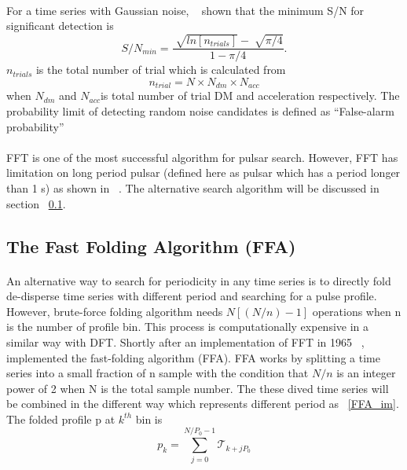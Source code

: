 \documentclass[thesis_msc.tex]{subfiles}
\begin{document}
        \paragraph{} For a time series with Gaussian noise, ~\cite{handbook} shown that the minimum S/N for significant detection is
        \begin{equation}
        S/N_{min}=\frac{\sqrt[]{ln[n_{trials}]}-\sqrt[]{\pi/4}}{1-\pi/4}.
        \end{equation}
		$n_{trials}$ is the total number of trial which is calculated from 
        \begin{equation} \label{n_trial}
        n_{trial}=N \times N_{dm} \times N_{acc}
        \end{equation}
        when $N_{dm}$  and $N_{acc}$is total number of trial DM and acceleration respectively. The probability limit of detecting random noise candidates is defined as ``False-alarm probability''  
\paragraph{} FFT is one of the most successful algorithm for pulsar search. However, FFT has limitation on long period pulsar (defined here as pulsar which has a period longer than 1 s) as shown in  ~\citep{kondratiev2009new}. The alternative search algorithm will be discussed in section ~\ref{FFA}.

        \subsection{The Fast Folding Algorithm (FFA)} \label{FFA}
        \paragraph{} An alternative way to search for periodicity in any time series is to directly fold de-disperse time series with different period and searching for a pulse profile. However, brute-force folding algorithm needs $N[(N/n)-1]$ operations when n is the number of profile bin. This process is computationally expensive in a similar way with DFT. Shortly after an implementation of FFT in 1965 ~\citep{FFT}, ~\cite{staelin1969passive} implemented the fast-folding algorithm (FFA). FFA works by splitting a time series into a small fraction of n sample with the condition that $N/n$ is an integer power of 2 when N is the total sample number. The these dived time series will be combined in the different way which represents different period as ~\ref{FFA_im}. The folded profile p at $k^{th}$ bin is 
        \begin{equation}
        p_k=\sum_{j=0}^{N/P_0-1}\mathcal{T}_{k+jP_0}
        \end{equation}
\end{document}
